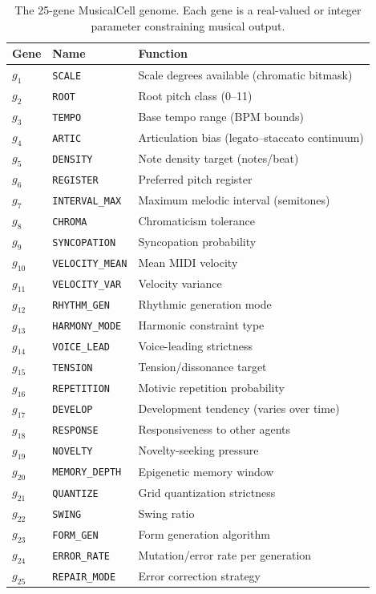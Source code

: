 \documentclass[11pt,a4paper]{article}
\begin{document}
\begin{table}[h]
\centering
\small
\begin{tabular}{@{}llp{5.5cm}@{}}
\toprule
\textbf{Gene} & \textbf{Name} & \textbf{Function} \\
\midrule
$g_1$ & \texttt{SCALE} & Scale degrees available (chromatic bitmask) \\
$g_2$ & \texttt{ROOT} & Root pitch class (0--11) \\
$g_3$ & \texttt{TEMPO} & Base tempo range (BPM bounds) \\
$g_4$ & \texttt{ARTIC} & Articulation bias (legato--staccato continuum) \\
$g_5$ & \texttt{DENSITY} & Note density target (notes/beat) \\
$g_6$ & \texttt{REGISTER} & Preferred pitch register \\
$g_7$ & \texttt{INTERVAL\_MAX} & Maximum melodic interval (semitones) \\
$g_8$ & \texttt{CHROMA} & Chromaticism tolerance \\
$g_9$ & \texttt{SYNCOPATION} & Syncopation probability \\
$g_{10}$ & \texttt{VELOCITY\_MEAN} & Mean MIDI velocity \\
$g_{11}$ & \texttt{VELOCITY\_VAR} & Velocity variance \\
$g_{12}$ & \texttt{RHYTHM\_GEN} & Rhythmic generation mode \\
$g_{13}$ & \texttt{HARMONY\_MODE} & Harmonic constraint type \\
$g_{14}$ & \texttt{VOICE\_LEAD} & Voice-leading strictness \\
$g_{15}$ & \texttt{TENSION} & Tension/dissonance target \\
$g_{16}$ & \texttt{REPETITION} & Motivic repetition probability \\
$g_{17}$ & \texttt{DEVELOP} & Development tendency (varies over time) \\
$g_{18}$ & \texttt{RESPONSE} & Responsiveness to other agents \\
$g_{19}$ & \texttt{NOVELTY} & Novelty-seeking pressure \\
$g_{20}$ & \texttt{MEMORY\_DEPTH} & Epigenetic memory window \\
$g_{21}$ & \texttt{QUANTIZE} & Grid quantization strictness \\
$g_{22}$ & \texttt{SWING} & Swing ratio \\
$g_{23}$ & \texttt{FORM\_GEN} & Form generation algorithm \\
$g_{24}$ & \texttt{ERROR\_RATE} & Mutation/error rate per generation \\
$g_{25}$ & \texttt{REPAIR\_MODE} & Error correction strategy \\
\bottomrule
\end{tabular}
\caption{The 25-gene MusicalCell genome. Each gene is a real-valued or integer parameter constraining musical output.}
\label{tab:genome}
\end{table}
\end{document}
